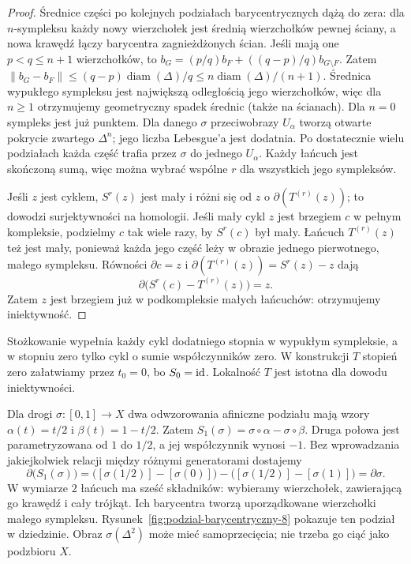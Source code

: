 \begin{proof}
Średnice części po kolejnych podziałach
barycentrycznych dążą do zera: dla
$n$-sympleksu każdy nowy wierzchołek
jest średnią wierzchołków pewnej ściany,
a nowa krawędź łączy barycentra zagnieżdżonych ścian.
Jeśli mają one $p<q\leq n+1$ wierzchołków, to
$b_G=(p/q)b_F+((q-p)/q)b_{G\setminus F}$.
Zatem $\|b_G-b_F\|\leq(q-p)\operatorname{diam}(\Delta)/q
\leq n\operatorname{diam}(\Delta)/(n+1)$.
Średnica wypukłego sympleksu jest największą odległością jego
wierzchołków, więc dla $n\geq1$ otrzymujemy geometryczny spadek
średnic (także na ścianach). Dla $n=0$ sympleks jest już punktem. Dla danego $\sigma$
przeciwobrazy $U_\alpha$ tworzą
otwarte pokrycie zwartego $\Delta^n$;
jego liczba Lebesgue'a jest dodatnia.
Po dostatecznie wielu podziałach
każda część trafia przez $\sigma$
do jednego $U_\alpha$.
Każdy łańcuch jest skończoną sumą,
więc można wybrać wspólne $r$
dla wszystkich jego sympleksów.

Jeśli $z$ jest cyklem, $S^r(z)$
jest mały i różni się od $z$
o $\partial(T^{(r)}(z))$; to dowodzi
surjektywności na homologii.
Jeśli mały cykl $z$ jest brzegiem
$c$ w pełnym kompleksie, podzielmy
$c$ tak wiele razy, by $S^r(c)$
był mały. Łańcuch $T^{(r)}(z)$
też jest mały, ponieważ każda
jego część leży w obrazie
jednego pierwotnego, małego sympleksu.
Równości $\partial c=z$ i
$\partial(T^{(r)}(z))=S^r(z)-z$ dają
\[
 \partial\bigl(S^r(c)-T^{(r)}(z)\bigr)=z.
\]
Zatem $z$ jest brzegiem już
w podkompleksie małych łańcuchów:
otrzymujemy iniektywność.
\end{proof}

Stożkowanie wypełnia każdy cykl dodatniego stopnia w wypukłym
sympleksie, a w stopniu zero tylko cykl o sumie współczynników zero.
W konstrukcji $T$ stopień zero załatwiamy przez $t_0=0$,
bo $S_0=\mathrm{id}$. Lokalność $T$ jest istotna dla dowodu iniektywności.

\begin{przyklad}
\label{prz:podzial-singularny-8}
Dla drogi $\sigma:[0,1]\to X$ dwa odwzorowania afiniczne podziału
mają wzory $\alpha(t)=t/2$ i $\beta(t)=1-t/2$.
Zatem $S_1(\sigma)=\sigma\circ\alpha-\sigma\circ\beta$.
Druga połowa jest parametryzowana od $1$ do $1/2$, a jej
współczynnik wynosi $-1$. Bez wprowadzania jakiejkolwiek
relacji między różnymi generatorami dostajemy
\[
 \partial\bigl(S_1(\sigma)\bigr)
 =\bigl([\sigma(1/2)]-[\sigma(0)]\bigr)
  -\bigl([\sigma(1/2)]-[\sigma(1)]\bigr)
 =\partial\sigma.
\]
W wymiarze $2$ łańcuch ma sześć składników: wybieramy wierzchołek,
zawierającą go krawędź i cały trójkąt. Ich barycentra tworzą
uporządkowane wierzchołki małego sympleksu.
Rysunek~\ref{fig:podzial-barycentryczny-8} pokazuje ten podział
w dziedzinie. Obraz $\sigma(\Delta^2)$ może mieć samoprzecięcia;
nie trzeba go ciąć jako podzbioru $X$.
\end{przyklad}

